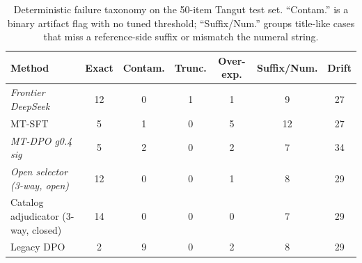 \begin{table}[t]
\centering
\small
\begin{tabular}{lcccccc}
\toprule
Method & Exact & Contam. & Trunc. & Over-exp. & Suffix/Num. & Drift \\
\midrule
\textit{Frontier DeepSeek} & 12 & 0 & 1 & 1 & 9 & 27 \\
MT-SFT & 5 & 1 & 0 & 5 & 12 & 27 \\
\textit{MT-DPO g0.4 sig} & 5 & 2 & 0 & 2 & 7 & 34 \\
\textit{Open selector (3-way, open)} & 12 & 0 & 0 & 1 & 8 & 29 \\
Catalog adjudicator (3-way, closed) & 14 & 0 & 0 & 0 & 7 & 29 \\
Legacy DPO & 2 & 9 & 0 & 2 & 8 & 29 \\
\bottomrule
\end{tabular}
\caption{Deterministic failure taxonomy on the 50-item Tangut test set. ``Contam.'' is a binary artifact flag with no tuned threshold; ``Suffix/Num.'' groups title-like cases that miss a reference-side suffix or mismatch the numeral string.}
\label{tab:failure-taxonomy}
\end{table}
